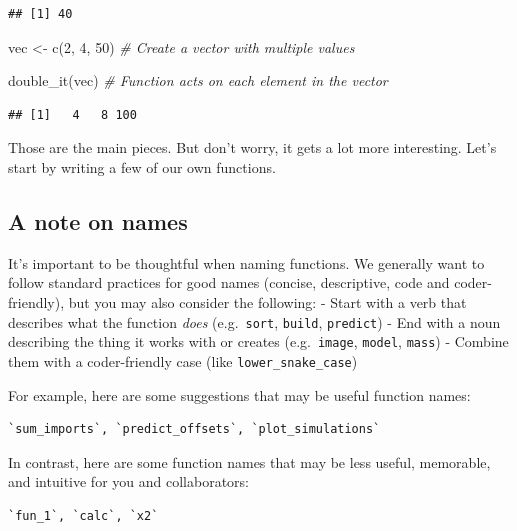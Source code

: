 \documentclass[
]{book}
\newenvironment{Shaded}{\begin{snugshade}}{\end{snugshade}}
\newcommand{\CommentTok}[1]{\textcolor[rgb]{0.56,0.35,0.01}{\textit{#1}}}
\newcommand{\DecValTok}[1]{\textcolor[rgb]{0.00,0.00,0.81}{#1}}
\newcommand{\FunctionTok}[1]{\textcolor[rgb]{0.00,0.00,0.00}{#1}}
\newcommand{\NormalTok}[1]{#1}
\newcommand{\OtherTok}[1]{\textcolor[rgb]{0.56,0.35,0.01}{#1}}
\begin{document}
\begin{verbatim}
## [1] 40
\end{verbatim}

\begin{Shaded}
\begin{Highlighting}[]
\NormalTok{vec }\OtherTok{\textless{}{-}} \FunctionTok{c}\NormalTok{(}\DecValTok{2}\NormalTok{, }\DecValTok{4}\NormalTok{, }\DecValTok{50}\NormalTok{) }\CommentTok{\# Create a vector with multiple values}

\FunctionTok{double\_it}\NormalTok{(vec) }\CommentTok{\# Function acts on each element in the vector}
\end{Highlighting}
\end{Shaded}

\begin{verbatim}
## [1]   4   8 100
\end{verbatim}

Those are the main pieces. But don't worry, it gets a lot more interesting. Let's start by writing a few of our own functions.

\hypertarget{a-note-on-names}{%
\subsection{A note on names}\label{a-note-on-names}}

It's important to be thoughtful when naming functions. We generally want to follow standard practices for good names (concise, descriptive, code and coder-friendly), but you may also consider the following:
- Start with a verb that describes what the function \emph{does} (e.g.~\texttt{sort}, \texttt{build}, \texttt{predict})
- End with a noun describing the thing it works with or creates (e.g.~\texttt{image}, \texttt{model}, \texttt{mass})
- Combine them with a coder-friendly case (like \texttt{lower\_snake\_case})

For example, here are some suggestions that may be useful function names:

\begin{verbatim}
`sum_imports`, `predict_offsets`, `plot_simulations`
\end{verbatim}

In contrast, here are some function names that may be less useful, memorable, and intuitive for you and collaborators:

\begin{verbatim}
`fun_1`, `calc`, `x2`
\end{verbatim}
\end{document}
